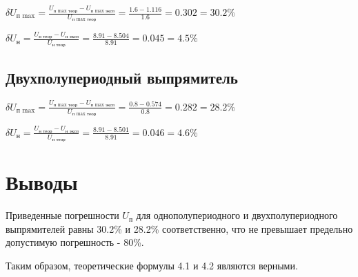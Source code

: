 $\delta U_\text{п max} = \frac{U_\text{п max\ \ теор} - U_\text{п max\ \ эксп}}{U_\text{п max\ \ теор}} = \frac{1.6 - 1.116}{1.6} = 0.302 = 30.2 \%$

$\delta U_\text{н} = \frac{U_\text{н\ \ теор} - U_\text{н\ \ эксп}}{U_\text{н\ \ теор}} = \frac{8.91 - 8.504}{8.91} = 0.045 = 4.5 \%$

\subsection{Двухполупериодный выпрямитель}

$\delta U_\text{п max} = \frac{U_\text{п max\ \ теор} - U_\text{п max\ \ эксп}}{U_\text{п max\ \ теор}} = \frac{0.8 - 0.574}{0.8} = 0.282 = 28.2 \%$

$\delta U_\text{н} = \frac{U_\text{н\ \ теор} - U_\text{н\ \ эксп}}{U_\text{н\ \ теор}} = \frac{8.91 - 8.501}{8.91} = 0.046 = 4.6 \%$

\section{Выводы}

 Приведенные погрешности $U_\text{п}$ для однополупериодного и двухполупериодного выпрямителей равны 30.2\% и 28.2\% соответственно, что не превышает предельно допустимую погрешность - 80\%.

Таким образом, теоретические формулы 4.1 и 4.2 являются верными.


